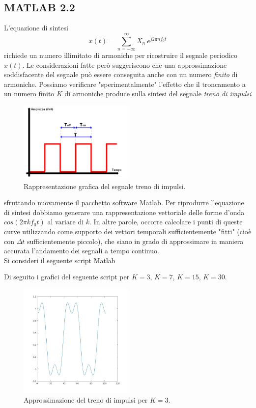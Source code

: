 \documentclass[12pt,oneside,openany]{memoir}
\numberwithin{equation}{subsection}
\begin{document}
\subsection{MATLAB 2.2}
L'equazione di sintesi 
\begin{equation}\label{eq:fourier_series_complex_form}
	x(t) = \sum_{n = -\infty}^{\infty} X_n \ e^{j 2 \pi n f_0 t}
\end{equation}
richiede un numero illimitato di armoniche per ricostruire il segnale periodico
$x(t)$. Le considerazioni fatte per\`o suggeriscono che una approssimazione
soddisfacente del segnale pu\`o essere conseguita anche con un numero
\textit{finito} di armoniche. Possiamo verificare "sperimentalmente" l'effetto
che il troncamento a un numero finito $K$ di armoniche produce sulla sintesi del
segnale \textit{treno di impulsi}
\begin{figure}[H]
	\centering
	\captionsetup{justification=centering}
	\includegraphics[width=0.5\textwidth]{images/treno_di_impulsi.png}
	\caption{Rappresentazione grafica del segnale treno di impulsi.}
\end{figure}
sfruttando nuovamente il pacchetto software Matlab. Per riprodurre l'equazione
di sintesi dobbiamo generare una rappresentazione vettoriale delle forme d'onda
$cos(2 \pi k f_0 t)$ al variare di $k$. In altre parole, occorre calcolare i
punti di queste curve utilizzando come supporto dei vettori temporali
sufficientemente "fitti" (cio\`e con $\Delta t$ sufficientemente piccolo), che
siano in grado di approssimare in maniera accurata l'andamento dei segnali a
tempo continuo.\\
Si consideri il seguente script Matlab

Di seguito i grafici del seguente script per $K = 3$, $K = 7$, $K = 15$, $K = 30$.
\begin{figure}[H]
	\centering
	\captionsetup{justification=centering}
	\includegraphics[width=0.5\textwidth]{images/matlab_approssimazione_1.jpg}
	\caption{Approssimazione del treno di impulsi per $K = 3$.}
\end{figure}
\end{document}
